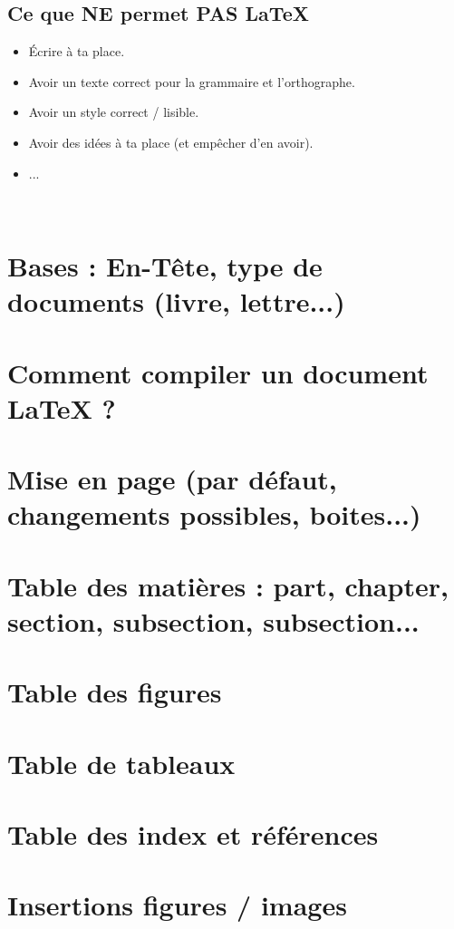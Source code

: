 \documentclass[11pt,twoside,a4paper]{article}
\begin{document}
\begin{landscape}
\begin{multicols}{2}
	\subsection{Ce que NE permet PAS \LaTeX}
	
	\begin{itemize}
		\item Écrire à ta place. 
		\item Avoir un texte correct pour la grammaire et l'orthographe. 
		\item Avoir un style correct / lisible. 
		\item Avoir des idées à ta place (et empêcher d'en avoir). 
		\item ...
	\end{itemize}
	
	\vfill~\\
	\columnbreak
	
	\section{Bases : En-Tête, type de documents (livre, lettre...)}
	\section{Comment compiler un document LaTeX ?}
	\section{Mise en page (par défaut, changements possibles, boites...)} 
	\section{Table des matières : part, chapter, section, subsection, subsection...} 
	\section{Table des figures} 
	\section{Table de tableaux} 
	\section{Table des index et références} 
	\section{Insertions figures / images}  

\end{multicols}
\end{landscape}
\end{document}
